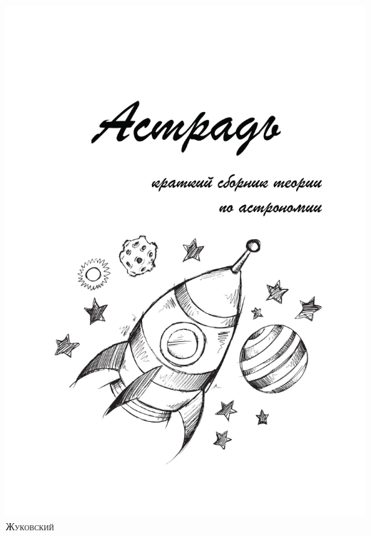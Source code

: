 \newpage
\thispagestyle{empty}
\begin{center}
\includegraphics[width=0.95\tw]{sys/cover.pdf}\\[1pc]
{\scshape Жуковский \\ \year}	
\end{center}
